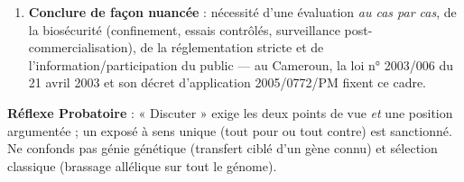 \documentclass[11pt]{article}
\newcommand{\cle}[1]{{\popxbold\color{popdark}#1}}
\begin{document}
\begin{methode}
\begin{enumerate}
\begin{itemize}
      \item \textbf{Enjeux socio-économiques} : brevetage du vivant, dépendance des paysans envers les semenciers (semences F1 non reproductibles, contrats), éthique (frontière des espèces).
      \end{itemize}
\item \textbf{Conclure de façon nuancée} : nécessité d'une évaluation \emph{au cas par cas}, de la \cle{biosécurité} (confinement, essais contrôlés, surveillance post-commercialisation), de la réglementation stricte et de l'information/participation du public — au Cameroun, la loi n° 2003/006 du 21 avril 2003 et son décret d'application 2005/0772/PM fixent ce cadre.
\end{enumerate}
\textbf{Réflexe Probatoire} : « Discuter » exige les deux points de vue \emph{et} une position argumentée ; un exposé à sens unique (tout pour ou tout contre) est sanctionné. Ne confonds pas génie génétique (transfert ciblé d'un gène connu) et sélection classique (brassage allélique sur tout le génome).
\end{methode}
\end{document}
